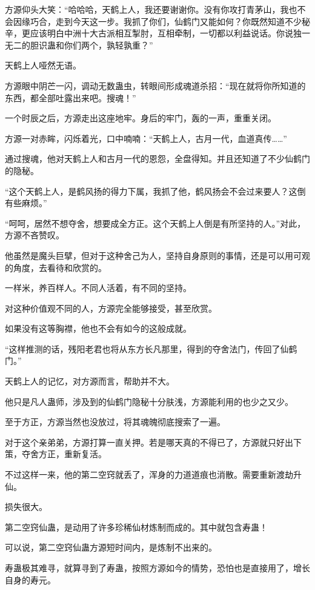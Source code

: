 \begin{this_body}
方源仰头大笑：“哈哈哈，天鹤上人，我还要谢谢你。没有你攻打青茅山，我也不会因缘巧合，走到今天这一步。我抓了你们，仙鹤门又能如何？你既然知道不少秘辛，更应该明白中洲十大古派相互掣肘，互相牵制，一切都以利益说话。你说独一无二的胆识蛊和你们两个，孰轻孰重？”

天鹤上人哑然无语。

方源眼中阴芒一闪，调动无数蛊虫，转眼间形成魂道杀招：“现在就将你所知道的东西，都全部吐露出来吧。搜魂！”

一个时辰之后，方源走出这座地牢。身后的牢门，轰的一声，重重关闭。

方源一对赤眸，闪烁着光，口中喃喃：“天鹤上人，古月一代，血道真传……”

通过搜魂，他对天鹤上人和古月一代的恩怨，全盘得知。并且还知道了不少仙鹤门的隐秘。

“这个天鹤上人，是鹤风扬的得力下属，我抓了他，鹤风扬会不会过来要人？这倒有些麻烦。”

“呵呵，居然不想夺舍，想要成全方正。这个天鹤上人倒是有所坚持的人。”对此，方源不吝赞叹。

他虽然是魔头巨擘，但对于这种舍己为人，坚持自身原则的事情，还是可以用可观的角度，去看待和欣赏的。

一样米，养百样人。不同人活着，有不同的坚持。

对这种价值观不同的人，方源完全能够接受，甚至欣赏。

如果没有这等胸襟，他也不会有如今的这般成就。

“这样推测的话，残阳老君也将从东方长凡那里，得到的夺舍法门，传回了仙鹤门。”

天鹤上人的记忆，对方源而言，帮助并不大。

他只是凡人蛊师，涉及到的仙鹤门隐秘十分肤浅，方源能利用的也少之又少。

至于方正，方源当然也没放过，将其魂魄彻底搜索了一遍。

对于这个亲弟弟，方源打算一直关押。若是哪天真的不得已了，方源就只好出下策，夺舍方正，重新复活。

不过这样一来，他的第二空窍就丢了，浑身的力道道痕也消散。需要重新渡劫升仙。

损失很大。

第二空窍仙蛊，是动用了许多珍稀仙材炼制而成的。其中就包含寿蛊！

可以说，第二空窍仙蛊方源短时间内，是炼制不出来的。

寿蛊极其难寻，就算寻到了寿蛊，按照方源如今的情势，恐怕也是直接用了，增长自身的寿元。


\end{this_body}
